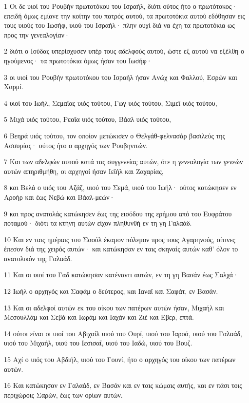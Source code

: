 \par 1 Οι δε υιοί του Ρουβήν πρωτοτόκου του Ισραήλ, διότι ούτος ήτο ο πρωτότοκος· επειδή όμως εμίανε την κοίτην του πατρός αυτού, τα πρωτοτόκια αυτού εδόθησαν εις τους υιούς του Ιωσήφ, υιού του Ισραήλ· πλην ουχί διά να έχη τα πρωτοτόκια ως προς την γενεαλογίαν·
\par 2 διότι ο Ιούδας υπερίσχυσεν υπέρ τους αδελφούς αυτού, ώστε εξ αυτού να εξέλθη ο ηγούμενος· τα πρωτοτόκια όμως ήσαν του Ιωσήφ·
\par 3 οι υιοί του Ρουβήν πρωτοτόκου του Ισραήλ ήσαν Ανώχ και Φαλλού, Εσρών και Χαρμί.
\par 4 υιοί του Ιωήλ, Σεμαΐας υιός τούτου, Γωγ υιός τούτου, Σιμεΐ υιός τούτου,
\par 5 Μιχά υιός τούτου, Ρεαΐα υιός τούτου, Βάαλ υιός τούτου,
\par 6 Βεηρά υιός τούτου, τον οποίον μετώκισεν ο Θελγάθ-φελνασάρ βασιλεύς της Ασσυρίας· ούτος ήτο ο αρχηγός των Ρουβηνιτών.
\par 7 Και των αδελφών αυτού κατά τας συγγενείας αυτών, ότε η γενεαλογία των γενεών αυτών απηριθμήθη, οι αρχηγοί ήσαν Ιεϊήλ και Ζαχαρίας,
\par 8 και Βελά ο υιός του Αζάζ, υιού του Σεμά, υιού του Ιωήλ· ούτος κατώκησεν εν Αροήρ και έως Νεβώ και Βάαλ-μεών·
\par 9 και προς ανατολάς κατώκησεν έως της εισόδου της ερήμου από του Ευφράτου ποταμού· διότι τα κτήνη αυτών είχον πληθυνθή εν τη γη Γαλαάδ.
\par 10 Και εν ταις ημέραις του Σαούλ έκαμον πόλεμον προς τους Αγαρηνούς, οίτινες έπεσον διά της χειρός αυτών· και κατώκησαν εν ταις σκηναίς αυτών καθ' όλον το ανατολικόν της Γαλαάδ.
\par 11 Και οι υιοί του Γαδ κατώκησαν κατέναντι αυτών, εν τη γη Βασάν έως Σαλχά·
\par 12 Ιωήλ ο αρχηγός και Σαφάμ ο δεύτερος, και Ιαναΐ και Σαφάτ, εν Βασάν.
\par 13 Και οι αδελφοί αυτών εκ του οίκου των πατέρων αυτών ήσαν, Μιχαήλ και Μεσουλλάμ και Σεβά και Ιωράμ και Ιαχάν και Ζιέ και Έβερ, επτά.
\par 14 ούτοι είναι οι υιοί του Αβιχαίλ υιού του Ουρί, υιού του Ιαροά, υιού του Γαλαάδ, υιού του Μιχαήλ, υιού του Ιεσισαΐ, υιού του Ιαδώ, υιού του Βουζ.
\par 15 Αχί ο υιός του Αβδιήλ, υιού του Γουνί, ήτο ο αρχηγός του οίκου των πατέρων αυτών.
\par 16 Και κατώκησαν εν Γαλαάδ, εν Βασάν και εν ταις κώμαις αυτής, και εν πάσι τοις περιχώροις Σαρών, έως των ορίων αυτών.
